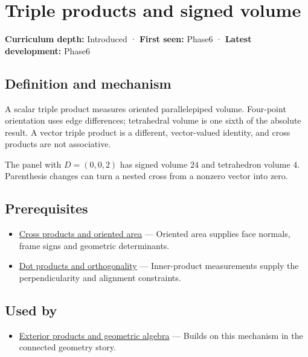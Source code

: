 \hypertarget{appendix-5caa058bd9c7}{}
\section{Triple products and signed volume}\label{appendix-5caa058bd9c7-triple-products-and-signed-volume}

\textbf{Curriculum depth:} Introduced · \textbf{First seen:} Phase6 · \textbf{Latest development:} Phase6

\subsection{Definition and mechanism}\label{appendix-5caa058bd9c7-definition-and-mechanism}

A scalar triple product measures oriented parallelepiped volume. Four-point orientation uses edge differences; tetrahedral volume is one sixth of the absolute result. A vector triple product is a different, vector-valued identity, and cross products are not associative.

The panel with \(D=(0,0,2)\) has signed volume \(24\) and tetrahedron volume \(4\). Parenthesis changes can turn a nested cross from a nonzero vector into zero.

\subsection{Prerequisites}\label{appendix-5caa058bd9c7-prerequisites}

\begin{itemize}
\tightlist
\item
  \hyperref[appendix-2391db8052b1]{Cross products and oriented area} --- Oriented area supplies face normals, frame signs and geometric determinants.
\item
  \hyperref[appendix-8bc4e8fc547c]{Dot products and orthogonality} --- Inner-product measurements supply the perpendicularity and alignment constraints.
\end{itemize}

\subsection{Used by}\label{appendix-5caa058bd9c7-used-by}

\begin{itemize}
\tightlist
\item
  \hyperref[appendix-e1960925d1b8]{Exterior products and geometric algebra} --- Builds on this mechanism in the connected geometry story.
\end{itemize}

